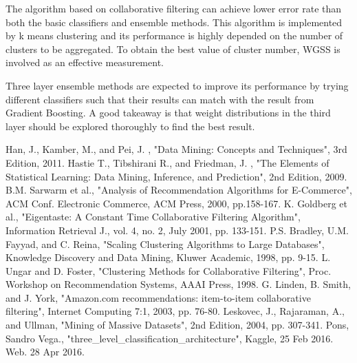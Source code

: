 \documentclass{sig-alternate-05-2015}
\begin{document}
The algorithm based on collaborative filtering can achieve lower error rate than both the basic classifiers and ensemble methods. This algorithm is implemented by k means clustering and its performance is highly depended on the number of clusters to be aggregated. To obtain the best value of cluster number, WGSS is involved as an effective measurement.

Three layer ensemble methods are expected to improve its performance by trying different classifiers such that their results can match with the result from Gradient Boosting. A good takeaway is that weight distributions in the third layer should be explored thoroughly to find the best result.

\medskip

\begin{thebibliography}{9}
 Han, J., Kamber, M., and Pei, J. , "Data Mining: Concepts and Techniques", 3rd Edition, 2011.
 Hastie T., Tibshirani R., and Friedman, J. , "The Elements of Statistical Learning: Data Mining, Inference, and Prediction", 2nd Edition, 2009.
 B.M. Sarwarm et al., "Analysis of Recommendation Algorithms for E-Commerce", ACM Conf. Electronic Commerce, ACM Press, 2000, pp.158-167.
 K. Goldberg et al., "Eigentaste: A Constant Time Collaborative Filtering Algorithm", Information Retrieval J., vol. 4, no. 2, July 2001, pp. 133-151.
 P.S. Bradley, U.M. Fayyad, and C. Reina, "Scaling Clustering Algorithms to Large Databases", Knowledge Discovery and Data Mining, Kluwer Academic, 1998, pp. 9-15.
 L. Ungar and D. Foster, "Clustering Methods for Collaborative Filtering", Proc. Workshop on Recommendation Systems, AAAI Press, 1998.
 G. Linden, B. Smith, and J. York, "Amazon.com recommendations: item-to-item collaborative filtering", Internet Computing 7:1, 2003, pp. 76-80.
 Leskovec, J., Rajaraman, A., and Ullman, "Mining of Massive Datasets", 2nd Edition, 2004, pp. 307-341.
 Pons, Sandro Vega., "three\_level\_classification\_architecture", Kaggle, 25 Feb 2016. Web. 28 Apr 2016.

\end{thebibliography}
\end{document}
